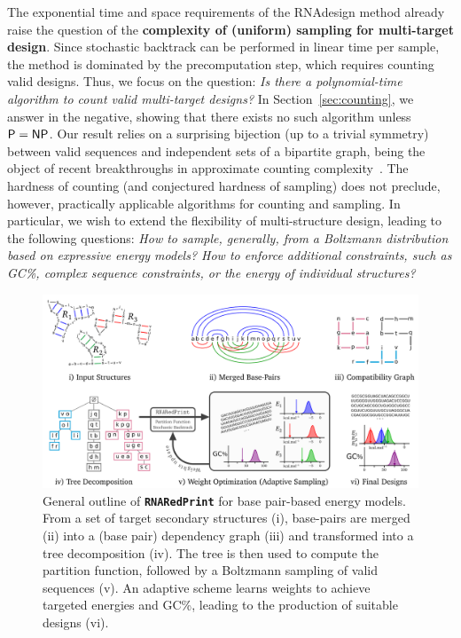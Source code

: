 \documentclass{bioinfo}
\newcommand{\Def}[1]{{\bfseries #1}}
\newcommand{\parHead}[1]{\Final{\paragraph{#1}}}
\newcommand{\Final}[1]{\begingroup\color{red!70!black}#1\endgroup}
\renewcommand{\Final}[1]{}
\newcommand{\Nuc}[1]{{\sf #1}}
\newcommand{\Cb}{\Nuc{C}}
\newcommand{\Gb}{\Nuc{G}}
\newcommand{\GCb}{\Gb\Cb}
\newcommand{\Software}[1]{{\ttfamily #1}}
\newcommand{\ourprog}{{\tt \bfseries{}\color{black!85}RNA\textcolor{red!70!black}{Red}Print}}
\begin{document}
\parHead{Motivation.} The exponential time and space requirements of the \Software{RNAdesign} method already raise the question of the \Def{complexity of (uniform) sampling for multi-target design}. Since stochastic backtrack can be performed in linear time per sample, the method is dominated by the precomputation step, which requires counting valid designs. Thus, we focus on the question: \emph{Is there a polynomial-time algorithm to count valid multi-target designs?} In Section~\ref{sec:counting}, we answer in the negative, showing that there exists no such algorithm unless ${\sf P}={\sf NP}$. Our result relies on a surprising bijection (up to a trivial symmetry) between valid sequences  and independent sets of a bipartite graph, being the object of recent breakthroughs in approximate counting complexity~\citep{Bulatov2013,Cai2016}.
The hardness of counting (and conjectured hardness of sampling) does not preclude, however, practically applicable algorithms for counting and sampling. In particular, we wish to extend the flexibility of multi-structure design, leading to the following questions: \emph{How to sample, generally, from a Boltzmann distribution based on expressive energy models? How to enforce additional constraints, such as \GCb\%, complex sequence constraints, or the energy of individual structures?}


\begin{figure}[t]
\begin{center}
    \includegraphics[width=.8\textwidth]{Workflow.pdf}
\end{center}
\caption{General outline of \ourprog{} for base pair-based energy models. From a set of target secondary structures (i), base-pairs are merged (ii) into a (base pair) dependency graph (iii) and transformed into a tree decomposition (iv). The tree is then used to compute the partition function, followed by a Boltzmann sampling of valid sequences (v). An adaptive scheme learns weights to achieve targeted energies and \GCb\%, leading to the production of suitable designs (vi).}
\label{fig:workflow}
\end{figure}
\end{document}
